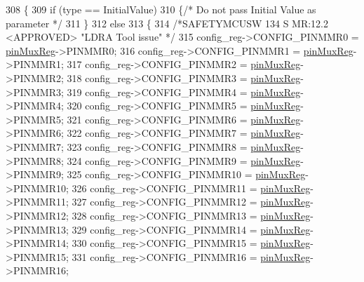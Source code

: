 \begin{DoxyCode}
308 \{
309     \textcolor{keywordflow}{if} (type == InitialValue)
310     \{\textcolor{comment}{/* Do not pass Initial Value as parameter */}
311     \}
312     \textcolor{keywordflow}{else}
313     \{
314     \textcolor{comment}{/*SAFETYMCUSW 134 S MR:12.2 <APPROVED> "LDRA Tool issue" */}
315         config\_reg->CONFIG\_PINMMR0  = \mbox{\hyperlink{reg__pinmux_8h_a489be2306394971fc7586946f88d6380}{pinMuxReg}}->PINMMR0;
316         config\_reg->CONFIG\_PINMMR1  = \mbox{\hyperlink{reg__pinmux_8h_a489be2306394971fc7586946f88d6380}{pinMuxReg}}->PINMMR1;
317         config\_reg->CONFIG\_PINMMR2  = \mbox{\hyperlink{reg__pinmux_8h_a489be2306394971fc7586946f88d6380}{pinMuxReg}}->PINMMR2;
318         config\_reg->CONFIG\_PINMMR3  = \mbox{\hyperlink{reg__pinmux_8h_a489be2306394971fc7586946f88d6380}{pinMuxReg}}->PINMMR3;
319         config\_reg->CONFIG\_PINMMR4  = \mbox{\hyperlink{reg__pinmux_8h_a489be2306394971fc7586946f88d6380}{pinMuxReg}}->PINMMR4;
320         config\_reg->CONFIG\_PINMMR5  = \mbox{\hyperlink{reg__pinmux_8h_a489be2306394971fc7586946f88d6380}{pinMuxReg}}->PINMMR5;
321         config\_reg->CONFIG\_PINMMR6  = \mbox{\hyperlink{reg__pinmux_8h_a489be2306394971fc7586946f88d6380}{pinMuxReg}}->PINMMR6;
322         config\_reg->CONFIG\_PINMMR7  = \mbox{\hyperlink{reg__pinmux_8h_a489be2306394971fc7586946f88d6380}{pinMuxReg}}->PINMMR7;
323         config\_reg->CONFIG\_PINMMR8  = \mbox{\hyperlink{reg__pinmux_8h_a489be2306394971fc7586946f88d6380}{pinMuxReg}}->PINMMR8;
324         config\_reg->CONFIG\_PINMMR9  = \mbox{\hyperlink{reg__pinmux_8h_a489be2306394971fc7586946f88d6380}{pinMuxReg}}->PINMMR9;
325         config\_reg->CONFIG\_PINMMR10 = \mbox{\hyperlink{reg__pinmux_8h_a489be2306394971fc7586946f88d6380}{pinMuxReg}}->PINMMR10;
326         config\_reg->CONFIG\_PINMMR11 = \mbox{\hyperlink{reg__pinmux_8h_a489be2306394971fc7586946f88d6380}{pinMuxReg}}->PINMMR11;
327         config\_reg->CONFIG\_PINMMR12 = \mbox{\hyperlink{reg__pinmux_8h_a489be2306394971fc7586946f88d6380}{pinMuxReg}}->PINMMR12;
328         config\_reg->CONFIG\_PINMMR13 = \mbox{\hyperlink{reg__pinmux_8h_a489be2306394971fc7586946f88d6380}{pinMuxReg}}->PINMMR13;
329         config\_reg->CONFIG\_PINMMR14 = \mbox{\hyperlink{reg__pinmux_8h_a489be2306394971fc7586946f88d6380}{pinMuxReg}}->PINMMR14;
330         config\_reg->CONFIG\_PINMMR15 = \mbox{\hyperlink{reg__pinmux_8h_a489be2306394971fc7586946f88d6380}{pinMuxReg}}->PINMMR15;
331         config\_reg->CONFIG\_PINMMR16 = \mbox{\hyperlink{reg__pinmux_8h_a489be2306394971fc7586946f88d6380}{pinMuxReg}}->PINMMR16;

\end{DoxyCode}
